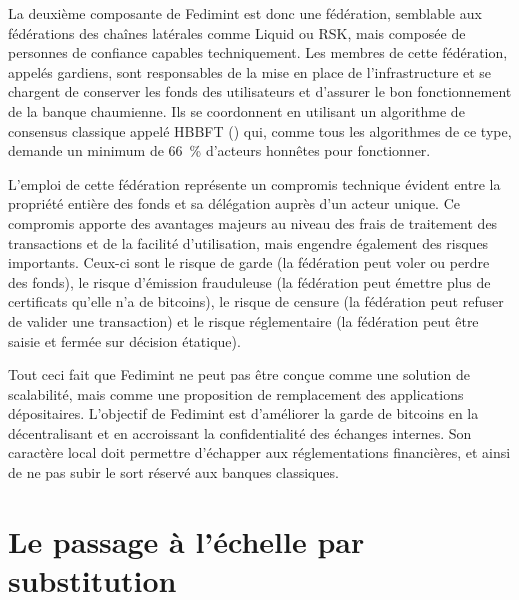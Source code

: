La deuxième composante de Fedimint est donc une fédération, semblable aux fédérations des chaînes latérales comme Liquid ou RSK, mais composée de personnes de confiance capables techniquement. Les membres de cette fédération, appelés gardiens, sont responsables de la mise en place de l'infrastructure et se chargent de conserver les fonds des utilisateurs et d'assurer le bon fonctionnement de la banque chaumienne. Ils se coordonnent en utilisant un algorithme de consensus classique appelé HBBFT () qui, comme tous les algorithmes de ce type, demande un minimum de 66~\% d'acteurs honnêtes pour fonctionner. %

L'emploi de cette fédération représente un compromis technique évident entre la propriété entière des fonds et sa délégation auprès d'un acteur unique. Ce compromis apporte des avantages majeurs au niveau des frais de traitement des transactions et de la facilité d'utilisation, mais engendre également des risques importants. Ceux-ci sont le risque de garde (la fédération peut voler ou perdre des fonds), le risque d'émission frauduleuse (la fédération peut émettre plus de certificats qu'elle n'a de bitcoins), le risque de censure (la fédération peut refuser de valider une transaction) et le risque réglementaire (la fédération peut être saisie et fermée sur décision étatique).

Tout ceci fait que Fedimint ne peut pas être conçue comme une solution de scalabilité, mais comme une proposition de remplacement des applications dépositaires. L'objectif de Fedimint est d'améliorer la garde de bitcoins en la décentralisant et en accroissant la confidentialité des échanges internes. Son caractère local doit permettre d'échapper aux réglementations financières, et ainsi de ne pas subir le sort réservé aux banques classiques.


\section*{Le passage à l'échelle par substitution}

